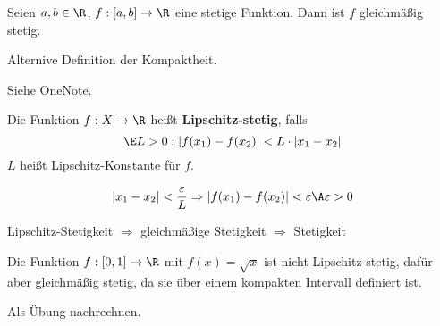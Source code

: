 \documentclass[main.tex]{subfiles}
\begin{document}
\begin{Theorem}
  Seien $a,b \in \R$, $f:[a,b]\to \R$ eine stetige Funktion. Dann ist $f$ gleichmäßig stetig.
\end{Theorem}

\begin{Bemerkung}
  Alternive Definition der Kompaktheit.
\end{Bemerkung}

\begin{Beweis}
  Siehe OneNote.
\end{Beweis}

\begin{Definition}
  Die Funktion $f: X\to \R$ heißt \textbf{Lipschitz-stetig}, falls
  $$\E L > 0 : |f(x_1)-f(x_2)| < L \cdot |x_1 - x_2|$$
  $L$ heißt Lipschitz-Konstante für $f$.
  \begin{Bemerkung}
    $$|x_1 - x_2| < \dfrac{\varepsilon}{L} \Rightarrow |f(x_1)-f(x_2)| < \varepsilon \A \varepsilon > 0$$
  \end{Bemerkung}
\end{Definition}

\begin{Theorem}
  Lipschitz-Stetigkeit $\Rightarrow$ gleichmäßige Stetigkeit $\Rightarrow$ Stetigkeit
\end{Theorem}

\begin{Beispiel}
  Die Funktion $f:[0,1] \to \R$ mit $f(x) = \sqrt{x}$ ist nicht Lipschitz-stetig, dafür aber gleichmäßig stetig, da sie über einem kompakten Intervall definiert ist.
  
  Als Übung nachrechnen.
\end{Beispiel}
\end{document}

